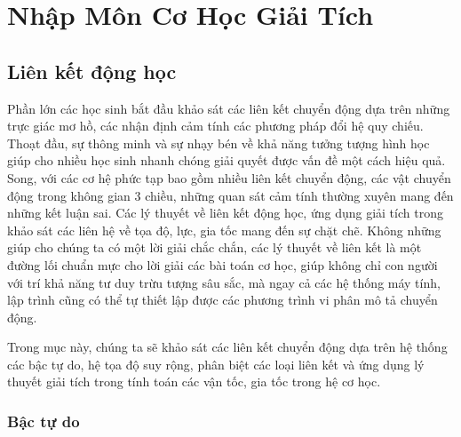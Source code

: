   
\chapter{Nhập Môn Cơ Học Giải Tích}

\section{Liên kết động học} \label{sec_9:Kinematic_link}

Phần lớn các học sinh bắt đầu khảo sát các liên kết chuyển động dựa trên những trực giác mơ hồ, các nhận định cảm tính các phương pháp đổi hệ quy chiếu.
Thoạt đầu, sự thông minh và sự nhạy bén về khả năng tưởng tượng hình học giúp cho nhiều học sinh nhanh chóng giải quyết được vấn đề một cách hiệu quả.
Song, với các cơ hệ phức tạp bao gồm nhiều liên kết chuyển động, các vật chuyển động trong không gian 3 chiều, những quan sát cảm tính thường xuyên mang đến những kết luận sai.
Các lý thuyết về liên kết động học, ứng dụng giải tích trong khảo sát các liên hệ về tọa độ, lực, gia tốc mang đến sự chặt chẽ.
Không những giúp cho chúng ta có một lời giải chắc chắn, các lý thuyết về liên kết là một đường lối chuẩn mực cho lời giải các bài toán cơ học, giúp không chỉ con người với trí khả năng tư duy trừu tượng sâu sắc, mà ngay cả các hệ thống máy tính, lập trình cũng có thể tự thiết lập được các phương trình vi phân mô tả chuyển động.

Trong mục này, chúng ta sẽ khảo sát các liên kết chuyển động dựa trên hệ thống các bậc tự do, hệ tọa độ suy rộng, phân biệt các loại liên kết và ứng dụng lý thuyết giải tích trong tính toán các vận tốc, gia tốc trong hệ cơ học.


\subsection{Bậc tự do}

